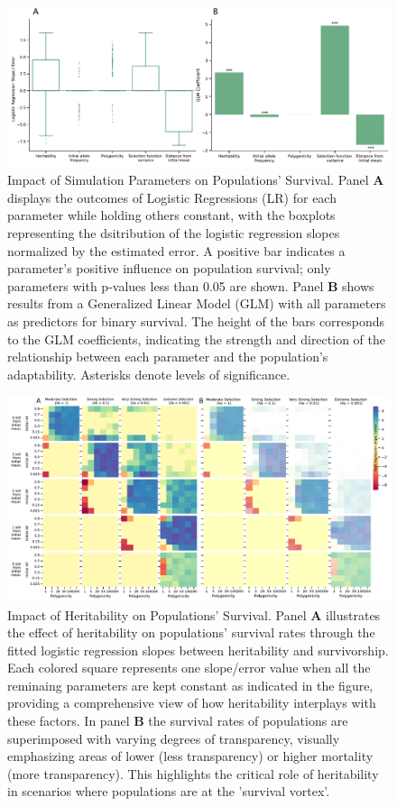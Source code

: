 \documentclass{article}
\begin{document}
\begin{figure}[b]
    \centering
    \includegraphics[width=1\textwidth]{figures/glm_logisticreg.pdf}
    \caption{Impact of Simulation Parameters on Populations' Survival.  Panel \textbf{A} displays the outcomes of Logistic Regressions (LR) for each parameter while holding others constant, with the boxplots representing the dsitribution of the logistic regression slopes normalized by the estimated error. A positive bar indicates a parameter's positive influence on population survival; only parameters with p-values less than 0.05 are shown. Panel \textbf{B} shows results from a Generalized Linear Model (GLM) with all parameters as predictors for binary survival. The height of the bars corresponds to the GLM coefficients, indicating the strength and direction of the relationship between each parameter and the population's adaptability. Asterisks denote levels of significance.}
    \label{fig:glm_logisticreg}
\end{figure}

\begin{figure}[b]
    \centering
    \includegraphics[width=1\textwidth]{figures/h2_panel_figure_2plots.pdf}
    \caption{Impact of Heritability on Populations' Survival. Panel \textbf{A} illustrates the effect of heritability on populations' survival rates through the fitted logistic regression slopes between heritability and survivorship. Each colored square represents one slope/error value when all the reminaing parameters are kept constant as indicated in the figure, providing a comprehensive view of how heritability interplays with these factors. In panel \textbf{B} the survival rates of populations are superimposed with varying degrees of transparency, visually emphasizing areas of lower (less transparency) or higher mortality (more transparency). This highlights the critical role of heritability in scenarios where populations are at the 'survival vortex'.}
    \label{fig:h2_panel_figure}
\end{figure}
\end{document}
